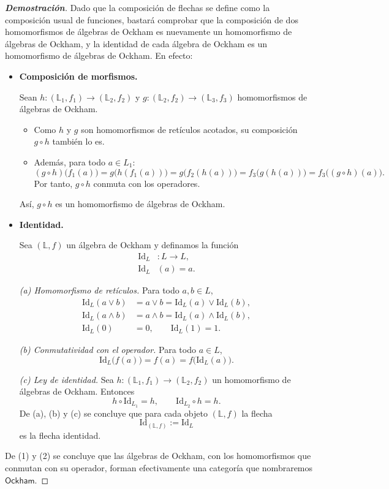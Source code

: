 \documentclass[12pt]{book}
\newcommand{\Id}{\mathrm{Id}}
\newcommand{\Ock}{\mathsf{Ockham}}
\begin{document}
\begin{proof}[\textbf{Demostración}]
Dado que la composición de flechas se define como la composición usual de funciones, bastará comprobar que la composición de dos homomorfismos de álgebras de Ockham es nuevamente un homomorfismo de álgebras de Ockham, y  la identidad de cada álgebra de Ockham es un homomorfismo de álgebras de Ockham. En efecto:

\begin{itemize}
\item[1.] \textbf{Composición de morfismos.}  

Sean $h\colon (\mathbb{L}_1,f_1)\to(\mathbb{L}_2,f_2)$ y $g\colon (\mathbb{L}_2,f_2)\to(\mathbb{L}_3,f_3)$ homomorfismos de álgebras de Ockham.  
\begin{itemize}
  \item Como $h$ y $g$ son homomorfismos de retículos acotados, su composición $g\circ h$ también lo es.
  \item Además, para todo $a\in L_1$:
  \[
    (g\circ h)\bigl(f_1(a)\bigr)
    = g\bigl(h(f_1(a))\bigr)
    = g\bigl(f_2(h(a))\bigr)
    = f_3\bigl(g(h(a))\bigr)
    = f_3\bigl((g\circ h)(a)\bigr).
  \]
  Por tanto, $g\circ h$ conmuta con los operadores.
\end{itemize}
Así, $g\circ h$ es un homomorfismo de álgebras de Ockham.

\item[2.] \textbf{Identidad.}  

Sea $(\mathbb{L},f)$ un álgebra de Ockham y definamos la función
\begin{align*}
\Id_L &\colon L\to L,\\
\Id_L&(a) = a.
\end{align*}

\noindent\emph{(a) Homomorfismo de retículos.}  
Para todo $a,b\in L$,
\begin{align*}
\Id_L(a\vee b)&=a\vee b=\Id_L(a)\vee\Id_L(b),\\
\Id_L(a\wedge b)&=a\wedge b=\Id_L(a)\wedge\Id_L(b),\\
\Id_L(0)&=0,\qquad \Id_L(1)=1.
\end{align*}

\noindent\emph{(b) Conmutatividad con el operador.}  
Para todo $a\in L$,
\[
  \Id_L\bigl(f(a)\bigr)=f(a)=f\bigl(\Id_L(a)\bigr).
\]

\noindent\emph{(c) Ley de identidad.}  
Sea $h\colon (\mathbb{L}_1,f_1)\to(\mathbb{L}_2,f_2)$ un homomorfismo de álgebras de Ockham. Entonces
\[
h\circ\Id_{L_1}=h,\qquad
\Id_{L_2}\circ h=h.
\]
De (a), (b) y (c) se concluye que para cada objeto $(\mathbb{L},f)$ la flecha
\[
\Id_{(\mathbb{L},f)}:=\Id_L
\]
es la flecha identidad.
\end{itemize}

\noindent De (1) y (2) se concluye que las álgebras de Ockham, con los homomorfismos que conmutan con su operador, forman efectivamente una categoría que nombraremos $\Ock$.
\end{proof}
\end{document}
